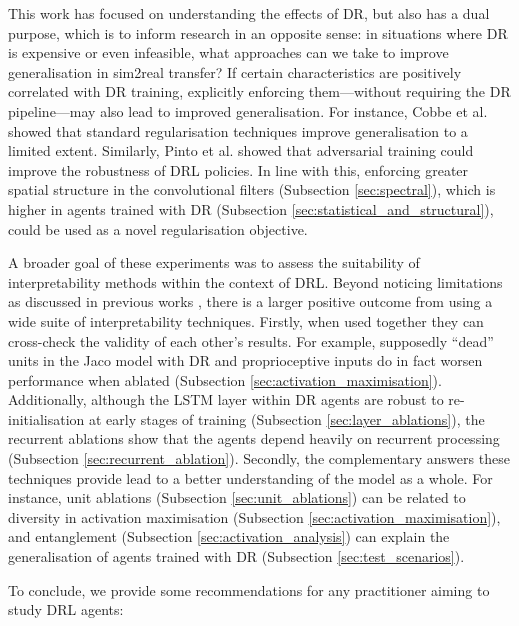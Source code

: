 This work has focused on understanding the effects of DR, but also has a
dual purpose, which is to inform research in an opposite sense: in
situations where DR is expensive or even infeasible, what approaches can
we take to improve generalisation in sim2real transfer? If certain
characteristics are positively correlated with DR training, explicitly
enforcing them---without requiring the DR pipeline---may also lead to
improved generalisation. For instance, Cobbe et al.
\cite{cobbe2018quantifying} showed that standard regularisation
techniques improve generalisation to a limited extent. Similarly, Pinto
et al. \cite{pinto2017robust} showed that adversarial training could
improve the robustness of DRL policies. In line with this, enforcing
greater spatial structure in the convolutional filters (Subsection
\ref{sec:spectral}), which is higher in agents trained with DR
(Subsection \ref{sec:statistical_and_structural}), could be used as a
novel regularisation objective.

A broader goal of these experiments was to assess the suitability of
interpretability methods within the context of DRL. Beyond noticing
limitations as discussed in previous works
\cite{kindermans2016investigating, mahendran2015understanding}, there
is a larger positive outcome from using a wide suite of interpretability
techniques. Firstly, when used together they can cross-check the
validity of each other's results. For example, supposedly ``dead'' units
in the Jaco model with DR and proprioceptive inputs do in fact worsen
performance when ablated (Subsection \ref{sec:activation_maximisation}).
Additionally, although the LSTM layer within DR agents are robust to
re-initialisation at early stages of training (Subsection
\ref{sec:layer_ablations}), the recurrent ablations show that the agents
depend heavily on recurrent processing (Subsection
\ref{sec:recurrent_ablation}). Secondly, the complementary answers these
techniques provide lead to a better understanding of the model as a
whole. For instance, unit ablations (Subsection
\ref{sec:unit_ablations}) can be related to diversity in activation
maximisation (Subsection \ref{sec:activation_maximisation}), and
entanglement (Subsection \ref{sec:activation_analysis}) can explain the
generalisation of agents trained with DR (Subsection
\ref{sec:test_scenarios}).

To conclude, we provide some recommendations for any practitioner aiming
to study DRL agents:

